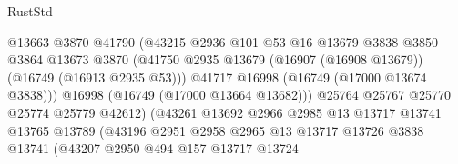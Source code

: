 \begin{lexlean}{RustStd}
\begin{coremodule}
                                        @13663
                                        @3870
                                        @41790
                                        (@43215
                                          @2936
                                          @101
                                          @53
                                          @16
                                          @13679
                                          @3838
                                          @3850
                                          @3864
                                          @13673
                                          @3870
                                          (@41750
                                            @2935
                                            @13679
                                            (@16907 (@16908 @13679))
                                            (@16749 (@16913 @2935 @53)))
                                          @41717
                                          @16998
                                          (@16749 (@17000 @13674 @3838)))
                                        @16998
                                        (@16749 (@17000 @13664 @13682)))
                                      @25764
                                      @25767
                                      @25770
                                      @25774
                                      @25779
                                      @42612)
                                    (@43261
                                      @13692
                                      @2966
                                      @2985
                                      @13
                                      @13717
                                      @13741
                                      @13765
                                      @13789
                                      (@43196
                                        @2951
                                        @2958
                                        @2965
                                        @13
                                        @13717
                                        @13726
                                        @3838
                                        @13741
                                        (@43207
                                          @2950
                                          @494
                                          @157
                                          @13717
                                          @13724

\end{coremodule}
\end{lexlean}
